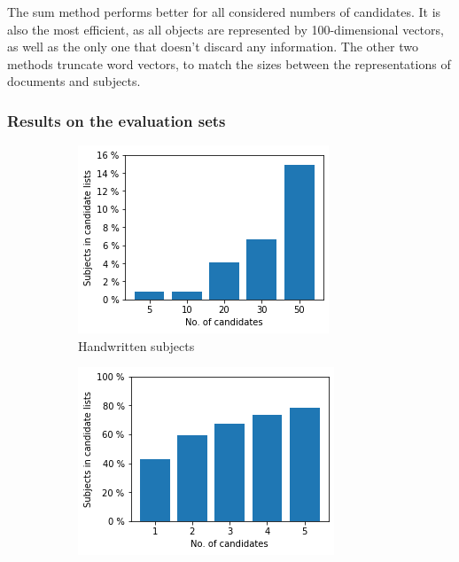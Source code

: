The sum method performs better for all considered numbers of candidates. It is also the most efficient, as all objects are represented by 100-dimensional vectors, as well as the only one that doesn't discard any information. The other two methods truncate word vectors, to match the sizes between the representations of documents and subjects.

\subsubsection{Results on the evaluation sets} \label{unsupervised_approach_results_eval}

\begin{figure}
  \begin{subfigure}[t]{.32\textwidth}
    \centering
    \includegraphics[width=\textwidth]{figures/unsupervised_approach/results/first_hw.png}
    \caption{Handwritten subjects}
    \label{fig:first_hw}
  \end{subfigure}
  \begin{subfigure}[t]{.32\textwidth}
    \centering
    \includegraphics[width=\textwidth]{figures/unsupervised_approach/results/first_ddc.png}

\end{subfigure}
\end{figure}
